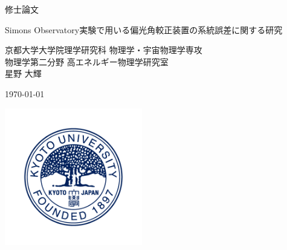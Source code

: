 \documentclass[../../main.tex]{subfiles}
\begin{document}
\begin{titlepage}
    \begin{center}
        \vspace*{5cm}

        \Large{修士論文}\\

        \vspace{0.2cm}

        \huge{Simons Observatory実験で用いる偏光角較正装置の系統誤差に関する研究}\\

        \vspace{1.5cm}

        \Large{京都大学大学院理学研究科 物理学・宇宙物理学専攻\\
        物理学第二分野 高エネルギー物理学研究室\\
        星野 大輝}

        \vspace{1cm}
        \today

        \vspace{2cm}

        \includegraphics[width=6cm]{title/ku_logo.png}
    \end{center}
\end{titlepage}
\end{document}

